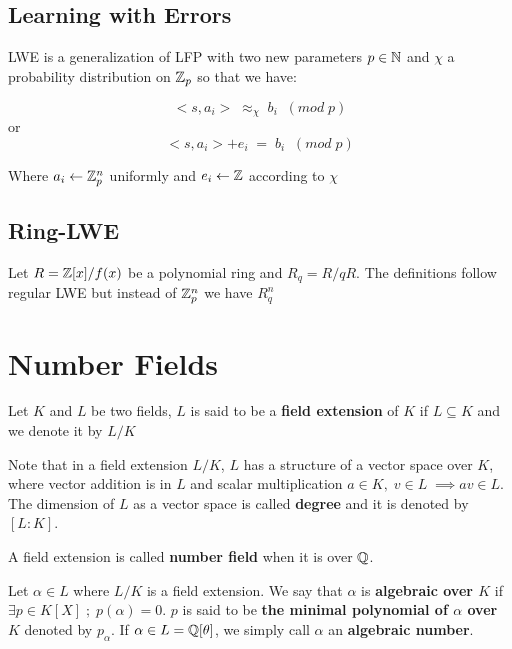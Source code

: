\documentclass[Ingles]{ic-tese-v3}
\begin{document}
\subsection{Learning with Errors}
\label{sec:org40fd3ae}
LWE is a generalization of LFP with two new parameters \(p \in \mathbb{N}\) and \(\chi\) a probability distribution on \(\mathbb{Z}_p\) so that we have:

$$ <s, a_i> \; \approx_\chi \; b_i \;\; (mod\; p) $$
or
$$ <s, a_i> + e_i \; = \;  b_i \;\; (mod\; p) $$

Where \(a_i \gets \mathbb{Z}^n_p\) uniformly and \(e_i \gets \mathbb{Z}\) according to \(\chi\)
\subsection{Ring-LWE}
\label{sec:org693567c}
Let \(R = \mathbb{Z}[x]/f(x)\) be a polynomial ring and \(R_q = R/qR\). The definitions follow regular LWE but instead of \(\mathbb{Z}^n_p\) we have \(R_q^n\)

\section{Number Fields}
\label{sec:org55e7f00}

   \begin{definition}
  Let $K$ and $L$ be two fields, $L$ is said to be a \textbf{field extension} of
  $K$ if $L \subseteq K$ and we denote it by $L/K$
\end{definition}

Note that in a field extension \(L/K\), \(L\) has a structure of a vector space over
\(K\), where vector addition is in \(L\) and scalar multiplication \(a \in K, \; v \in L
   \; \implies av \in L\). The dimension of \(L\) as a vector space is called
\textbf{degree} and it is denoted by \([L:K]\).

\begin{definition}
  A field extension is called \textbf{number field} when it is over $\mathbb{Q}$.
\end{definition}

\begin{definition}
  Let $\alpha \in L$ where $L/K$ is a field extension. We say that $\alpha$ is
  \textbf{algebraic over $K$} if $\exists p \in K[X] \;;\; p(\alpha) = 0$. $p$ is said to be
  \textbf{the minimal polynomial of $\alpha$ over $K$} denoted by $p_\alpha$. If $\alpha \in L =
  \mathbb{Q}[\theta]$, we simply call $\alpha$ an \textbf{algebraic number}.
\end{definition}
\end{document}
